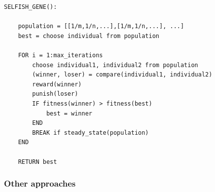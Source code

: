 
\begin{frame}[fragile]
\vspace{-0.8cm}
{\scriptsize
\begin{verbatim}
SELFISH_GENE():
    
    population = [[1/m,1/n,...],[1/m,1/n,...], ...]
    best = choose individual from population
    
    FOR i = 1:max_iterations
        choose individual1, individual2 from population
        (winner, loser) = compare(individual1, individual2)
        reward(winner)
        punish(loser)
        IF fitness(winner) > fitness(best)
            best = winner
        END
        BREAK if steady_state(population)
    END
    
    RETURN best
\end{verbatim}}

\end{frame}


\begin{frame}
  \frametitle{Other approaches}
\end{frame}
